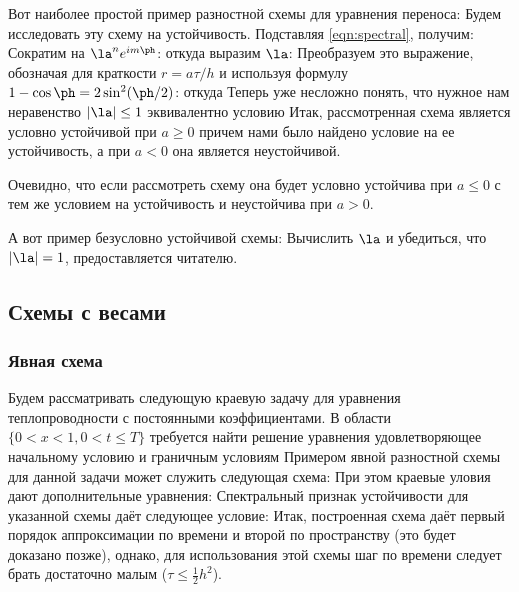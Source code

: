 \documentclass[a4paper]{article}
\begin{document}
\begin{ex}
Вот наиболее простой пример разностной схемы для уравнения переноса:
Будем исследовать эту схему на устойчивость. Подставляя \eqref{eqn:spectral},
получим: 
Сократим на $\la^n e^{im\ph}$:
 откуда выразим
$\la$:
Преобразуем это выражение, обозначая для краткости $r=a\tau/h$ и
используя формулу $1-\cos\ph=2\sin^2(\ph/2)$:
 откуда
Теперь уже несложно понять, что нужное нам неравенство $|\la|\le1$
эквивалентно условию 
Итак, рассмотренная схема является условно устойчивой при $a\ge0$\т
причем нами было найдено условие на ее устойчивость, а при $a<0$ она
является неустойчивой.
\end{ex}

\begin{note}
Очевидно, что если рассмотреть схему
она будет условно устойчива при $a\le0$ с тем же условием на
устойчивость и неустойчива при $a>0$.
\end{note}

А вот пример безусловно устойчивой схемы:
Вычислить $\la$ и убедиться, что $|\la|=1$, предоставляется читателю.

\subsection{Схемы с весами}

\subsubsection{Явная схема}

Будем рассматривать следующую краевую задачу для уравнения
теплопроводности с постоянными коэффициентами. В области $\{0<x<1,0<t\le T\}$
требуется найти решение уравнения
удовлетворяющее начальному условию
и граничным условиям
Примером явной разностной схемы для данной задачи может служить следующая схема:
При этом краевые уловия дают дополнительные уравнения:
Спектральный признак устойчивости для указанной схемы даёт следующее условие:
Итак, построенная схема даёт первый порядок аппроксимации по времени и второй по пространству (это будет доказано позже),
однако, для использования этой схемы шаг по времени следует брать достаточно малым ($\tau\le\frac12h^2$).
\end{document}
